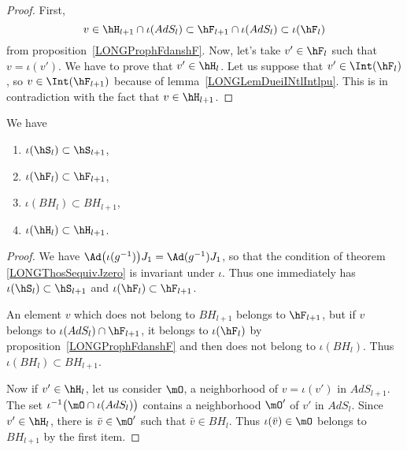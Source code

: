 \begin{proof}
	First,
	\begin{equation}
		v\in\hH_{l+1}\cap\iota(AdS_l)\subset\hF_{l+1}\cap\iota(AdS_l)\subset\iota(\hF_l)
	\end{equation}
	from proposition~\ref{LONGProphFdanshF}. Now, let's take $v'\in\hF_l$ such that $v=\iota(v')$. We have to prove that $v'\in\hH_l$. Let us suppose that $v'\in\Int(\hF_l)$, so $v\in\Int(\hF_{l+1})$ because of lemma~\ref{LONGLemDueiINtlIntlpu}. This is in contradiction with the fact that $v\in\hH_{l+1}$.
\end{proof}

\begin{corollary}        \label{LONGCorDeuxTrucsBHhH}
	We have
	\begin{multicols}{2}
		\begin{enumerate}

			\item
			      $\iota(\hS_l)\subset\hS_{l+1}$,
			\item
			      $\iota(\hF_l)\subset\hF_{l+1}$,
			\item
			      $\iota(BH_l)\subset BH_{l+1}$,
			\item
			      $\iota(\hH_l)\subset \hH_{l+1}$.

		\end{enumerate}
	\end{multicols}
\end{corollary}

\begin{proof}
	We have $\Ad\big( \iota(g^{-1}) \big)J_1=\Ad(g^{-1})J_1$, so that the condition of theorem \eqref{LONGThosSequivJzero} is invariant under $\iota$. Thus one immediately has $\iota(\hS_l)\subset\hS_{l+1}$ and $\iota(\hF_l)\subset\hF_{l+1}$.

	An element $v$ which does not belong to $BH_{l+1}$ belongs to $\hF_{l+1}$, but if $v$ belongs to $\iota(AdS_l)\cap\hF_{l+1}$, it belongs to $\iota(\hF_l)$ by proposition~\ref{LONGProphFdanshF} and then does not belong to $\iota(BH_l)$. Thus $\iota(BH_{l})\subset BH_{l+1}$.

	Now if $v'\in\hH_l$, let us consider $\mO$, a neighborhood of $v=\iota(v')$ in $AdS_{l+1}$. The set $\iota^{-1}\big( \mO\cap\iota(AdS_l) \big)$ contains a neighborhood $\mO'$ of $v'$ in $AdS_{l}$. Since $v'\in\hH_l$, there is $\bar v\in\mO'$ such that $\bar v\in BH_l$. Thus $\iota(\bar v)\in\mO$ belongs to $BH_{l+1}$ by the first item.

\end{proof}


